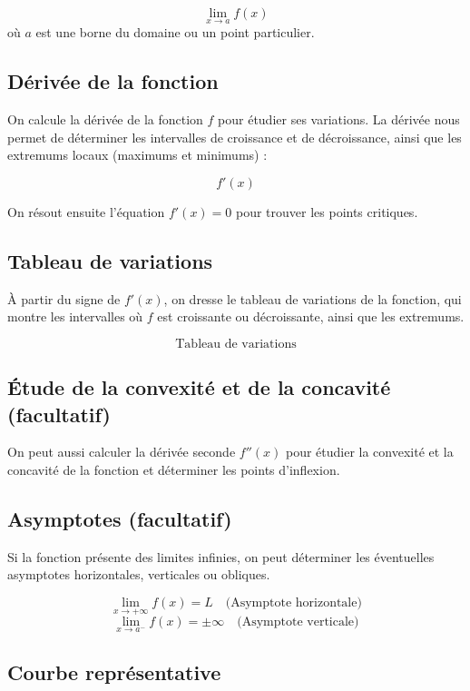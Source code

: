 \documentclass{article}
\begin{document}
	\[
	\lim_{x \to a} f(x)
	\]
	où \( a \) est une borne du domaine ou un point particulier.
	
	\subsection{Dérivée de la fonction}
	
	On calcule la dérivée de la fonction \( f \) pour étudier ses variations. La dérivée nous permet de déterminer les intervalles de croissance et de décroissance, ainsi que les extremums locaux (maximums et minimums) :
	
	\[
	f'(x)
	\]
	
	On résout ensuite l'équation \( f'(x) = 0 \) pour trouver les points critiques.
	
	\subsection{Tableau de variations}
	
	À partir du signe de \( f'(x) \), on dresse le tableau de variations de la fonction, qui montre les intervalles où \( f \) est croissante ou décroissante, ainsi que les extremums.
	
	\[
	\text{Tableau de variations}
	\]
	
	\subsection{Étude de la convexité et de la concavité (facultatif)}
	
	On peut aussi calculer	 la dérivée seconde \( f''(x) \) pour étudier la convexité et la concavité de la fonction et déterminer les points d'inflexion.
	
	\subsection{Asymptotes (facultatif)}
	
	Si la fonction présente des limites infinies, on peut déterminer les éventuelles asymptotes horizontales, verticales ou obliques.
	
	\[
	\lim_{x \to +\infty} f(x) = L \quad \text{(Asymptote horizontale)}
	\]
	\[
	\lim_{x \to a^-} f(x) = \pm \infty \quad \text{(Asymptote verticale)}
	\]
	
	\subsection{Courbe représentative}
	
\end{document}
